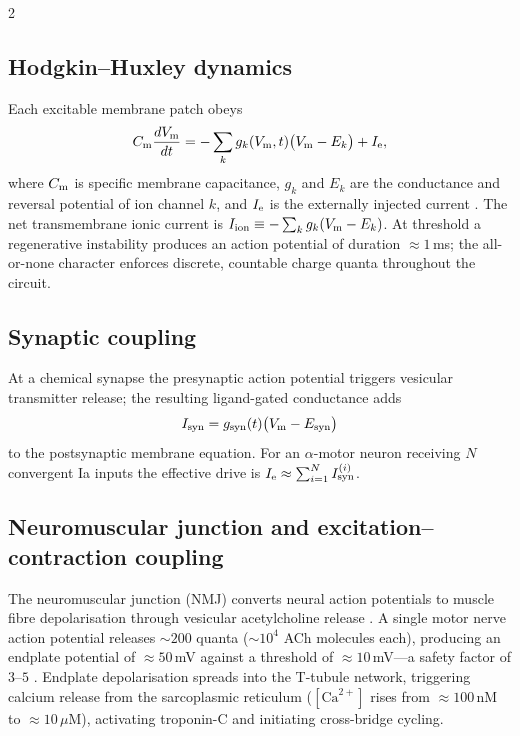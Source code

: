 \begin{multicols}{2}
\subsection{Hodgkin--Huxley dynamics}

Each excitable membrane patch obeys
\begin{equation}
  C_{\mathrm{m}}\frac{dV_{\mathrm{m}}}{dt}
  = -\sum_{k} g_k(V_{\mathrm{m}},t)\bigl(V_{\mathrm{m}} - E_k\bigr) + I_{\mathrm{e}},
  \label{eq:ch06-hh}
\end{equation}
where $C_{\mathrm{m}}$ is specific membrane capacitance, $g_k$ and $E_k$ are the
conductance and reversal potential of ion channel $k$, and $I_{\mathrm{e}}$ is the
externally injected current \citep{hodgkin1952}.  The net transmembrane ionic
current is $I_{\mathrm{ion}} \equiv -\sum_k g_k(V_{\mathrm{m}}-E_k)$.  At threshold a
regenerative instability produces an action potential of duration $\approx
1$\,ms; the all-or-none character enforces discrete, countable charge quanta
throughout the circuit.

\subsection{Synaptic coupling}

At a chemical synapse the presynaptic action potential triggers
vesicular transmitter release; the resulting ligand-gated conductance adds
\begin{equation}
  I_{\mathrm{syn}} = g_{\mathrm{syn}}(t)\bigl(V_{\mathrm{m}} - E_{\mathrm{syn}}\bigr)
  \label{eq:ch06-syn}
\end{equation}
to the postsynaptic membrane equation.  For an $\alpha$-motor neuron receiving
$N$ convergent Ia inputs the effective drive is
$I_{\mathrm{e}} \approx \sum_{i=1}^{N}I_{\mathrm{syn}}^{(i)}$.

\subsection{Neuromuscular junction and excitation--contraction coupling}

The neuromuscular junction (NMJ) converts neural action potentials to muscle
fibre depolarisation through vesicular acetylcholine release
\citep{katz1967,katz1972}.  A single motor nerve action potential releases
$\sim 200$ quanta ($\sim 10^{4}$ ACh molecules each), producing an endplate
potential of $\approx 50$\,mV against a threshold of $\approx 10$\,mV---a
safety factor of $3$--$5$ \citep{wood2001,ruff2011}.  Endplate depolarisation
spreads into the T-tubule network, triggering calcium release from the
sarcoplasmic reticulum ($[\mathrm{Ca}^{2+}]$ rises from $\approx 100$\,nM to
$\approx 10$\,$\mu$M), activating troponin-C and initiating cross-bridge
cycling.


\end{multicols}
